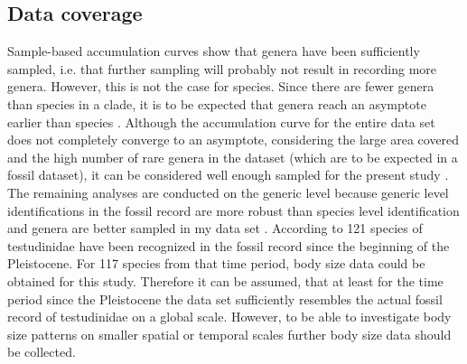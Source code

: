 \subsection{Data coverage}
Sample-based accumulation curves show that genera have been sufficiently sampled, i.e. that further sampling will probably not result in recording more genera. However, this is not the case for species.
Since there are fewer genera than species in a clade, it is to be expected that genera reach an asymptote earlier than species \citep{Gotelli2001}.
Although the accumulation curve for the entire data set does not completely converge to an asymptote, considering the large area covered \citep{Thompson2002} and the high number of rare genera in the dataset (which are to be expected in a fossil dataset), it can be considered well enough sampled for the present study \citep{Gotelli2001}.
The remaining analyses are conducted on the generic level because generic level identifications in the fossil record are more robust than species level identification and genera are better sampled in my data set \citep{Jass2014}.
According to \cite{Rhodin2015} 121 species of testudinidae have been recognized in the fossil record since the beginning of the Pleistocene. For 117 species from that time period, body size data could be obtained for this study. Therefore it can be assumed, that at least for the time period since the Pleistocene the data set sufficiently resembles the actual fossil record of testudinidae on a global scale. %
However, to be able to investigate body size patterns on smaller spatial or temporal scales further body size data should be collected.



%

